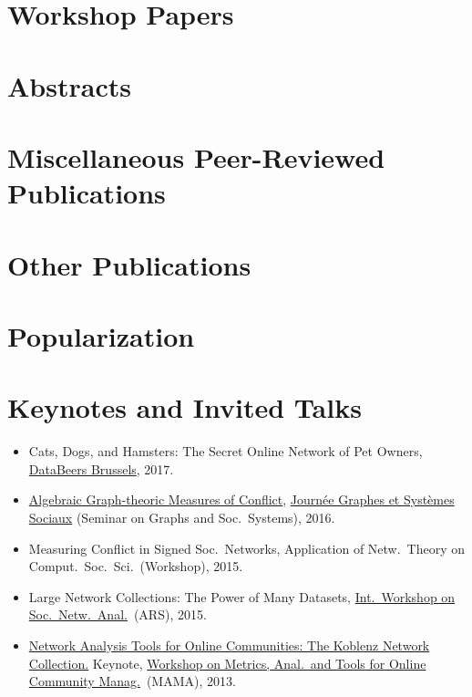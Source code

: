 \documentclass[line,mm]{res}
\newcounter{x}
\newcounter{y}
\newcommand{\talknumber}{T\arabic{y}\stepcounter{y}}
\begin{document}
\begin{resume}
\section{Workshop Papers}    
\section{Abstracts}          
\section{Miscellaneous Peer-Reviewed Publications}	
\section{Other Publications} 
\section{Popularization}     

\section{Keynotes and Invited Talks}
\begin{itemize}
\item[{[\talknumber]}]
  Cats, Dogs, and Hamsters:  The Secret Online Network of Pet Owners,
  \href{http://databeers.brussels/}{DataBeers Brussels}, 2017.   
\item[{[\talknumber]}] 
  \href{https://www.slideshare.net/kunegis/algebraic-graphtheoretic-measures-of-conflict}{Algebraic Graph-theoric Measures of Conflict}, 
  \href{http://jgss.sciencesconf.org/}{Journée Graphes et Systèmes
    Sociaux} (Seminar on Graphs and Soc.\ Systems), 2016.  
\item[{[\talknumber]}] Measuring Conflict in Signed Soc.\ Networks, 
  Application of Netw.\ Theory on Comput.\ Soc.\ Sci.\ (Workshop), 2015.
\item[{[\talknumber]}] 
  Large Network Collections:  The Power of Many Datasets,
  \href{http://www.ars15.unisa.it/}{Int.\ Workshop on Soc.\ Netw.\ Anal.}\ (ARS), 2015. 
\item[{[\talknumber]}] 
  \href{https://github.com/kunegis/pdfs/blob/master/kunegis:konect-mama.presentation.pdf}{Network
    Analysis Tools for Online Communities: The Koblenz Network 
    Collection.} Keynote, \href{http://mama.west.uni-koblenz.de/}{Workshop
    on Metrics, Anal.\ and Tools for Online Community Manag.}\ (MAMA), 2013.  
\end{itemize}


\end{resume}
\end{document}
